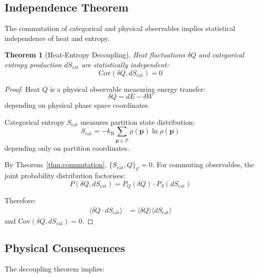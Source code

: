 \documentclass[twocolumn,10pt]{article}
\newtheorem{theorem}{Theorem}[section]
\newcommand{\kB}{k_{\mathrm{B}}}
\begin{document}
\subsection{Independence Theorem}

The commutation of categorical and physical observables implies statistical independence of heat and entropy.

\begin{theorem}[Heat-Entropy Decoupling]
\label{thm:decoupling}
Heat fluctuations $\delta Q$ and categorical entropy production $dS_{\mathrm{cat}}$ are statistically independent:
\begin{equation}
    \mathrm{Cov}(\delta Q, dS_{\mathrm{cat}}) = 0
\end{equation}
\end{theorem}

\begin{proof}
Heat $Q$ is a physical observable measuring energy transfer:
\begin{equation}
    \delta Q = dE - \delta W
\end{equation}
depending on physical phase space coordinates.

Categorical entropy $S_{\mathrm{cat}}$ measures partition state distribution:
\begin{equation}
    S_{\mathrm{cat}} = -\kB \sum_{\mathbf{p} \in \mathcal{P}} \rho(\mathbf{p}) \ln \rho(\mathbf{p})
\end{equation}
depending only on partition coordinates.

By Theorem~\ref{thm:commutation}, $\{S_{\mathrm{cat}}, Q\}_{\mathcal{C}} = 0$. For commuting observables, the joint probability distribution factorises:
\begin{equation}
    P(\delta Q, dS_{\mathrm{cat}}) = P_Q(\delta Q) \cdot P_S(dS_{\mathrm{cat}})
\end{equation}

Therefore:
\begin{align}
    \langle \delta Q \cdot dS_{\mathrm{cat}} \rangle &= \langle \delta Q \rangle \langle dS_{\mathrm{cat}} \rangle
\end{align}
and $\mathrm{Cov}(\delta Q, dS_{\mathrm{cat}}) = 0$.
\end{proof}

\subsection{Physical Consequences}

The decoupling theorem implies:
\end{document}
